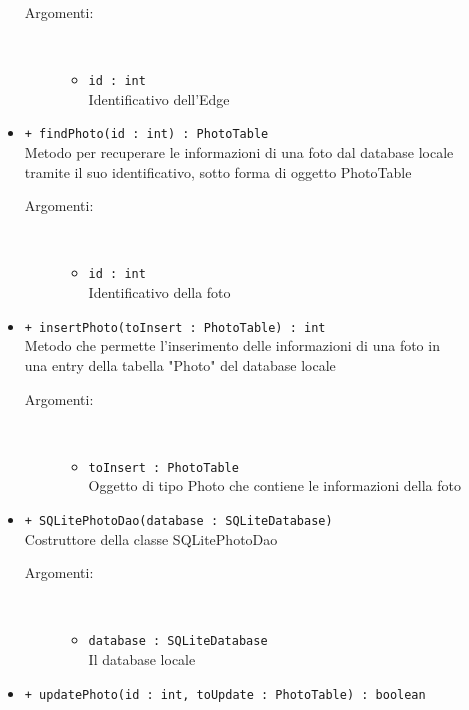 \documentclass[../DefinizioneDiProdotto.tex]{subfiles}
\begin{document}
\begin{description}
\begin{itemize}
 \begin{description}
\item[Argomenti:] \
\begin{itemize}
\item \texttt{id : int}\\
Identificativo dell'Edge\end{itemize}
\end{description}
\item \texttt{+ findPhoto(id : int) : PhotoTable}\\
Metodo per recuperare le informazioni di una foto dal database locale tramite il suo identificativo, sotto forma di oggetto PhotoTable
 \begin{description}
\item[Argomenti:] \
\begin{itemize}
\item \texttt{id : int}\\
Identificativo della foto\end{itemize}
\end{description}
\item \texttt{+ insertPhoto(toInsert : PhotoTable) : int}\\
Metodo che permette l'inserimento delle informazioni di una foto in una entry della tabella "Photo" del database locale
 \begin{description}
\item[Argomenti:] \
\begin{itemize}
\item \texttt{toInsert : PhotoTable}\\
Oggetto di tipo Photo che contiene le informazioni della foto\end{itemize}
\end{description}
\item \texttt{+ SQLitePhotoDao(database : SQLiteDatabase)}\\
Costruttore della classe SQLitePhotoDao
 \begin{description}
\item[Argomenti:] \
\begin{itemize}
\item \texttt{database : SQLiteDatabase}\\
Il database locale\end{itemize}
\end{description}
\item \texttt{+ updatePhoto(id : int, toUpdate : PhotoTable) : boolean}\\

\end{itemize}
\end{description}
\end{document}

